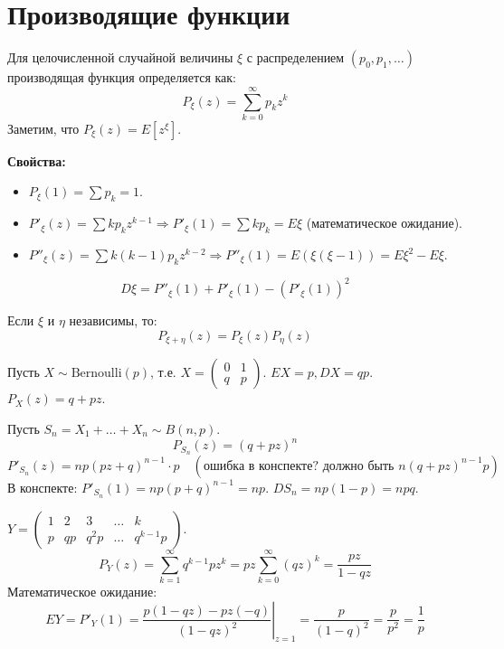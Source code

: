 \section{Производящие функции}

\begin{definition}
Для целочисленной случайной величины $\xi$ с распределением $(p_0, p_1, \dots)$ производящая функция определяется как:
$$ P_\xi(z) = \sum_{k=0}^{\infty} p_k z^k $$
Заметим, что $P_\xi(z) = E[z^\xi]$.
\end{definition}

\textbf{Свойства:}
\begin{itemize}
    \item $P_\xi(1) = \sum p_k = 1$.
    \item $P'_\xi(z) = \sum k p_k z^{k-1} \Rightarrow P'_\xi(1) = \sum k p_k = E\xi$ (математическое ожидание).
    \item $P''_\xi(z) = \sum k(k-1) p_k z^{k-2} \Rightarrow P''_\xi(1) = E(\xi(\xi-1)) = E\xi^2 - E\xi$.
\end{itemize}

\begin{statement}
$$ D\xi = P''_\xi(1) + P'_\xi(1) - (P'_\xi(1))^2 $$
\end{statement}

\begin{theorem}
Если $\xi$ и $\eta$ независимы, то:
$$ P_{\xi+\eta}(z) = P_\xi(z) P_\eta(z) $$
\end{theorem}

\begin{example}
Пусть $X \sim \text{Bernoulli}(p)$, т.е. $X = \begin{pmatrix} 0 & 1 \\ q & p \end{pmatrix}$.
$EX = p, DX = qp$.
$P_X(z) = q + pz$.

Пусть $S_n = X_1 + \dots + X_n \sim B(n, p)$.
$$ P_{S_n}(z) = (q + pz)^n $$
$$ P'_{S_n}(z) = np(pz+q)^{n-1} \cdot p \quad (\text{ошибка в конспекте? должно быть } n(q+pz)^{n-1}p) $$
В конспекте: $P'_{S_n}(1) = np(p+q)^{n-1} = np$.
$D S_n = np(1-p) = npq$.
\end{example}

\begin{example}
$Y = \begin{pmatrix} 1 & 2 & 3 & \dots & k \\ p & qp & q^2p & \dots & q^{k-1}p \end{pmatrix}$.
$$ P_Y(z) = \sum_{k=1}^{\infty} q^{k-1} p z^k = pz \sum_{k=0}^{\infty} (qz)^k = \frac{pz}{1-qz} $$
Математическое ожидание:
$$ E Y = P'_Y(1) = \left. \frac{p(1-qz) - pz(-q)}{(1-qz)^2} \right|_{z=1} = \frac{p}{(1-q)^2} = \frac{p}{p^2} = \frac{1}{p} $$
\end{example}

